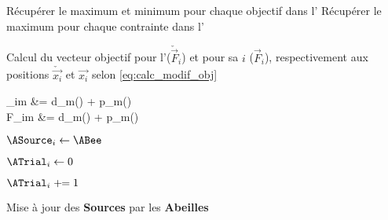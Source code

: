 \begin{algorithm}\label{alg:maj_phase}
  \SetAlgoVlined
  \DontPrintSemicolon
  Récupérer le maximum et minimum pour chaque objectif dans l’\AHive\;
  Récupérer le maximum pour chaque contrainte dans l’\AHive\;
  \For{$\ABee \in \ABees$}
  {
    Calcul du vecteur objectif pour l’\ABee ($\check{\vec{F}}_{i}$) et pour sa \ASource $i$ ($\vec{F}_{i}$),
    respectivement aux positions $\check{\vec{x_{i}}}$ et $\vec{x_{i}}$
    selon \eqref{eq:calc_modif_obj}\;
    {
      \begin{algomathdisplay}
      \begin{aligned}
      _{im} &= d_{m}() + p_{m}() \\
      F_{im}         &= d_{m}() + p_{m}() \\
      \end{aligned}
      \end{algomathdisplay}
    }
    {

      $\ASource_{i} \leftarrow \ABee$ 

      $\ATrial_{i} \leftarrow 0$ 
    }
    \Else
    {
      $\ATrial_{i} \pluseq 1$ 
    }
  }
  \caption{Mise à jour des \textbf{Sources} par les \textbf{Abeilles}}
\end{algorithm}

